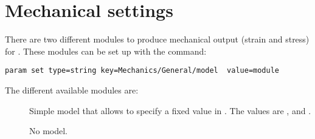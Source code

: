 \section{Mechanical settings}

There are two different modules to produce mechanical output (strain and stress) for \MMonCa. These modules can be set up with the command:

\begin{lstlisting}
param set type=string key=Mechanics/General/model  value=module
\end{lstlisting}

The different available modules are:
\begin{description}
\item[] Simple model that allows to specify a fixed value in . The values are ,  and .
\item[] No model.
\end{description}
